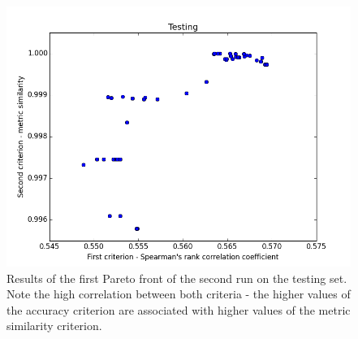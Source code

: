 \begin{figure}	
	\includegraphics[width=\columnwidth]{Images/nsgaValidation.PNG}
	\centering
	\caption{Results of the first Pareto front of the second run on the testing set. Note the high correlation between both criteria - the higher values of the accuracy criterion are associated with higher values of the metric similarity criterion.}	
	\label{fig:NSGABestValidation}
\end{figure}